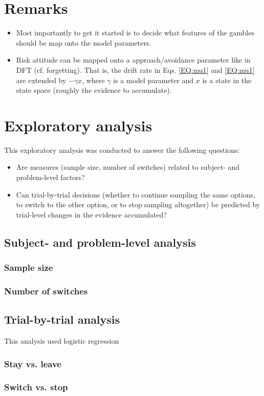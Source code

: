 \documentclass[english,doc]{apa}
\begin{document}
\section{Remarks}
\begin{itemize}
\item Most importantly to get it started is to decide what features of the gambles should be  map onto the model parameters. 
\item Risk attitude can be mapped onto a approach/avoidance parameter like in DFT (cf. forgetting). That is, the drift rate in Eqs. \ref{EQ:mu1} and \ref{EQ:mu1} are extended by $-\gamma x$, where $\gamma$ is a model parameter and $x$ is a state in the state space (roughly the evidence to accumulate). 
\end{itemize}



\section{Exploratory analysis}

This exploratory analysis was conducted to answer the following questions:

\begin{itemize}
\item Are measures (sample size, number of switches) related to subject- and problem-level factors?
\item Can trial-by-trial decisions (whether to continue sampling the same options, to switch to the other option, or to stop sampling altogether) be predicted by trial-level changes in the evidence accumulated?	
\end{itemize}

\subsection{Subject- and problem-level analysis}

\subsubsection{Sample size}

\subsubsection{Number of switches}

\subsection{Trial-by-trial analysis}

This analysis used logistic regression 

\subsubsection{Stay vs. leave}


\subsubsection{Switch vs. stop}
\end{document}
